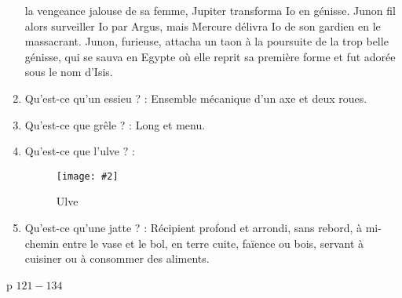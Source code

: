 \documentclass[a4paper, 11pt, hidelinks]{article}
\newcommand{\img}[4]{\begin{figure}[!ht]
    \centering
    \texttt{[image: \#2]}
    \caption{#3}
    \label{#4}
    \end{figure} }
\begin{document}
\begin{enumerate}
            la vengeance jalouse de sa femme, Jupiter transforma Io en génisse. Junon fil alors surveiller Io par Argus, mais Mercure délivra Io de son gardien en le massacrant.
            Junon, furieuse, attacha un taon à la poursuite de la trop belle génisse, qui se sauva en Egypte où elle reprit sa première forme et fut adorée sous le nom d'Isis.
      \item Qu'est-ce qu'un essieu ? : Ensemble mécanique d'un axe et deux roues.
      \item Qu'est-ce que grêle ? : Long et menu.
      \item Qu'est-ce que l'ulve ? : 
            \img{0.2}{Ulve.jpg}{Ulve}{121}
      \item Qu'est-ce qu'une jatte ? : Récipient profond et arrondi, sans rebord, à mi-chemin entre le vase et le bol, en terre cuite, faïence ou bois, servant à cuisiner ou à consommer des aliments.
\end{enumerate}


p $121 - 134$
\end{document}
